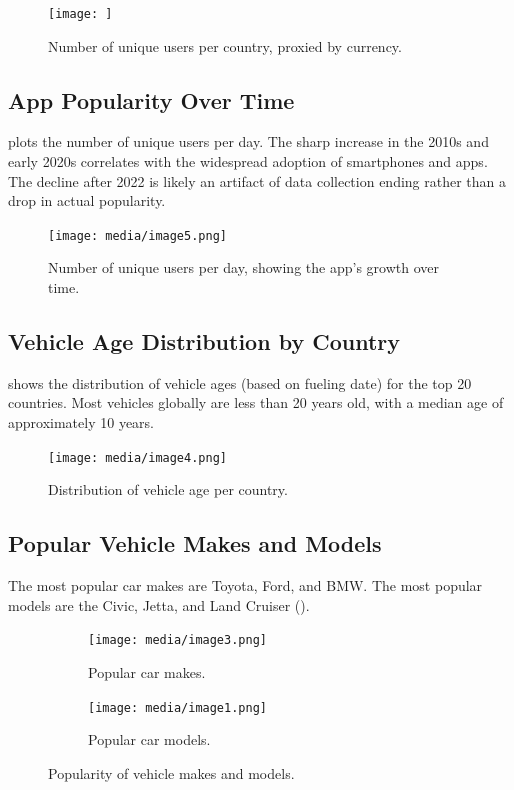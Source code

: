 \documentclass{article}
\begin{document}
\begin{figure}[htbp]
    \centering
    \texttt{[image: ]}
    \caption{Number of unique users per country, proxied by currency.}
    \label{fig:users_per_country}
\end{figure}

\subsection{App Popularity Over Time}
 plots the number of unique users per day. The sharp increase in the 2010s and early 2020s correlates with the widespread adoption of smartphones and apps. The decline after 2022 is likely an artifact of data collection ending rather than a drop in actual popularity.

\begin{figure}[htbp]
    \centering
    \texttt{[image: media/image5.png]}
    \caption{Number of unique users per day, showing the app's growth over time.}
    \label{fig:users_per_day}
\end{figure}

\subsection{Vehicle Age Distribution by Country}
 shows the distribution of vehicle ages (based on fueling date) for the top 20 countries. Most vehicles globally are less than 20 years old, with a median age of approximately 10 years.

\begin{figure}[htbp]
    \centering
    \texttt{[image: media/image4.png]}
    \caption{Distribution of vehicle age per country.}
    \label{fig:vehicle_age}
\end{figure}

\subsection{Popular Vehicle Makes and Models}
The most popular car makes are Toyota, Ford, and BMW. The most popular models are the Civic, Jetta, and Land Cruiser ().

\begin{figure}[htbp]
    \centering
    \begin{subfigure}[b]{0.45\textwidth}
        \centering
        \texttt{[image: media/image3.png]}
        \caption{Popular car makes.}
    \end{subfigure}
    \hfill
    \begin{subfigure}[b]{0.45\textwidth}
        \centering
        \texttt{[image: media/image1.png]}
        \caption{Popular car models.}
    \end{subfigure}
    \caption{Popularity of vehicle makes and models.}
    \label{fig:pop_models}
\end{figure}
\end{document}
